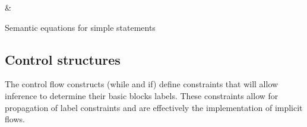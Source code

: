 \begin{table}[H]
\begin{semanticequations}
&\semeq{\iS}{\varepsilon}{\ienvL \; \ienvF}{(\emptyset, \ienvL)} \seSpace
 \seSpace
\end{semanticequations}
\caption{Semantic equations for simple statements}
\label{cstr:statements}
\end{table}

\subsection{Control structures}
The control flow constructs (while and if) define constraints that will allow inference to determine their basic blocks labels.
These constraints allow for propagation of label constraints and are effectively the implementation of implicit flows.

